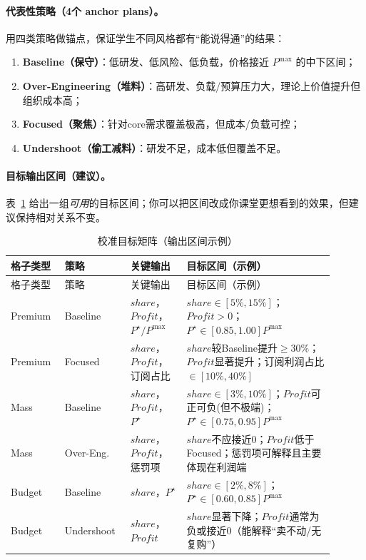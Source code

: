 \documentclass[UTF8,12pt]{ctexart}
\begin{document}
\paragraph{代表性策略（4个 anchor plans）。}
用四类策略做锚点，保证学生不同风格都有“能说得通”的结果：
\begin{enumerate}
  \item \textbf{Baseline（保守）}：低研发、低风险、低负载，价格接近 $P^{\max}$ 的中下区间；
  \item \textbf{Over-Engineering（堆料）}：高研发、负载/预算压力大，理论上价值提升但组织成本高；
  \item \textbf{Focused（聚焦）}：针对core需求覆盖极高，但成本/负载可控；
  \item \textbf{Undershoot（偷工减料）}：研发不足，成本低但覆盖不足。
\end{enumerate}

\paragraph{目标输出区间（建议）。}
表~\ref{tab:targets} 给出一组\emph{可用}的目标区间；你可以把区间改成你课堂更想看到的效果，但建议保持相对关系不变。

\begin{longtable}{p{0.14\linewidth}p{0.18\linewidth}p{0.16\linewidth}p{0.42\linewidth}}
\caption{校准目标矩阵（输出区间示例）}\label{tab:targets}\\
\toprule
格子类型 & 策略 & 关键输出 & 目标区间（示例）\\
\midrule
\endfirsthead
\toprule
格子类型 & 策略 & 关键输出 & 目标区间（示例）\\
\midrule
\endhead
Premium & Baseline & $share$，$Profit$，$P^\star/P^{\max}$ & $share\in[5\%,15\%]$；$Profit>0$；$P^\star\in[0.85,1.00]P^{\max}$\\
Premium & Focused & $share$，$Profit$，订阅占比 & $share$较Baseline提升$\ge 30\%$；$Profit$显著提升；订阅利润占比$\in[10\%,40\%]$\\
Mass & Baseline & $share$，$Profit$，$P^\star$ & $share\in[3\%,10\%]$；$Profit$可正可负(但不极端)；$P^\star\in[0.75,0.95]P^{\max}$\\
Mass & Over-Eng. & $share$，$Profit$，惩罚项 & $share$不应接近0；$Profit$低于Focused；惩罚项可解释且主要体现在利润端\\
Budget & Baseline & $share$，$P^\star$ & $share\in[2\%,8\%]$；$P^\star\in[0.60,0.85]P^{\max}$\\
Budget & Undershoot & $share$，$Profit$ & $share$显著下降；$Profit$通常为负或接近0（能解释“卖不动/无复购”）\\
\bottomrule
\end{longtable}
\end{document}
